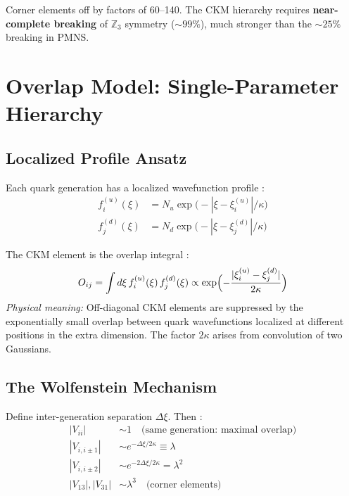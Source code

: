 \begin{tcolorbox}[colback=red!5, colframe=red!50!black,
    title=\textbf{Verdict: DFT Baseline STRONGLY FALSIFIED}]
Corner elements off by factors of 60--140. The CKM hierarchy requires
\textbf{near-complete breaking} of $\mathbb{Z}_3$ symmetry ($\sim 99\%$),
much stronger than the $\sim 25\%$ breaking in PMNS.
\end{tcolorbox}

\section{Overlap Model: Single-Parameter Hierarchy}
\label{sec:overlap_model}

\subsection{Localized Profile Ansatz}

Each quark generation has a localized wavefunction profile \tagP{}:
\begin{align}
    f_i^{(u)}(\xi) &= N_u \exp\bigl(-|\xi - \xi_i^{(u)}|/\kappa\bigr) \\
    f_j^{(d)}(\xi) &= N_d \exp\bigl(-|\xi - \xi_j^{(d)}|/\kappa\bigr)
\end{align}

The CKM element is the overlap integral \tagDc{}:
\begin{equation}
    O_{ij} = \int d\xi\, f_i^{(u)}(\xi)\, f_j^{(d)}(\xi) \propto
    \exp\Bigl(-\frac{|\xi_i^{(u)} - \xi_j^{(d)}|}{2\kappa}\Bigr)
\end{equation}
\emph{Physical meaning:} Off-diagonal CKM elements are suppressed by the exponentially
small overlap between quark wavefunctions localized at different positions in the
extra dimension. The factor $2\kappa$ arises from convolution of two Gaussians.

\subsection{The Wolfenstein Mechanism}

Define inter-generation separation $\Delta\xi$. Then \tagDc{}:
\begin{align}
    |V_{ii}| &\sim 1 \quad \text{(same generation: maximal overlap)} \\
    |V_{i,i\pm 1}| &\sim e^{-\Delta\xi/2\kappa} \equiv \lambda \\
    |V_{i,i\pm 2}| &\sim e^{-2\Delta\xi/2\kappa} = \lambda^2 \\
    |V_{13}|, |V_{31}| &\sim \lambda^3 \quad \text{(corner elements)}
\end{align}

